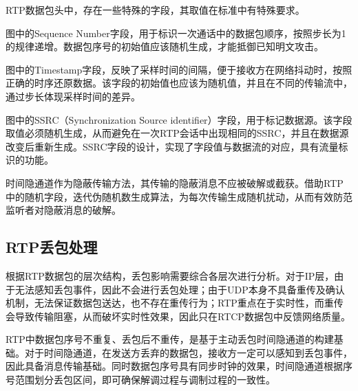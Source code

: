 RTP数据包头中，存在一些特殊的字段，其取值在标准中有特殊要求。

图中的{Sequence Number}字段，用于标识一次通话中的数据包顺序，按照步长为1的规律递增。数据包序号的初始值应该随机生成，才能抵御已知明文攻击。

图中的{Timestamp}字段，反映了采样时间的间隔，便于接收方在网络抖动时，按照正确的时序还原数据。该字段的初始值也应该为随机值，并且在不同的传输流中，通过步长体现采样时间的差异。

图中的{SSRC}（{Synchronization Source identifier}）字段，用于标记数据源。该字段取值必须随机生成，从而避免在一次RTP会话中出现相同的{SSRC}，并且在数据源改变后重新生成。{SSRC}字段的设计，实现了字段值与数据流的对应，具有流量标识的功能。

时间隐通道作为隐蔽传输方法，其传输的隐蔽消息不应被破解或截获。借助RTP中的随机字段，迭代伪随机数生成算法，为每次传输生成随机扰动，从而有效防范监听者对隐蔽消息的破解。

\subsection{RTP丢包处理}
\label{chap:backinfo:rtp:dropout}

根据RTP数据包的层次结构，丢包影响需要综合各层次进行分析。对于IP层，由于无法感知丢包事件，因此不会进行丢包处理；由于UDP本身不具备重传及确认机制，无法保证数据包送达，也不存在重传行为；RTP重点在于实时性，而重传会导致传输阻塞，从而破坏实时性效果，因此只在RTCP数据包中反馈网络质量。

RTP中数据包序号不重复、丢包后不重传，是基于主动丢包时间隐通道的构建基础。对于时间隐通道，在发送方丢弃的数据包，接收方一定可以感知到丢包事件，因此具备消息传输基础。同时数据包序号具有同步时钟的效果，时间隐通道根据序号范围划分丢包区间，即可确保解调过程与调制过程的一致性。